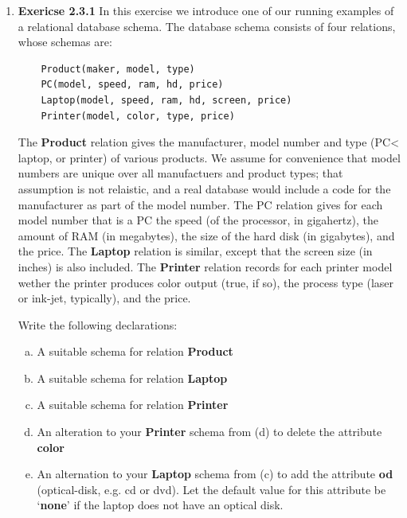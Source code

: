\documentclass[12pt]{article}
\begin{document}
\begin{enumerate}[1.]
    \item \textbf{Exericse 2.3.1} In this exercise we introduce one of our running
    examples of a relational database schema. The database schema consists of four relations,
    whose schemas are:

    \bigskip

    \begin{lstlisting}
    Product(maker, model, type)
    PC(model, speed, ram, hd, price)
    Laptop(model, speed, ram, hd, screen, price)
    Printer(model, color, type, price)
    \end{lstlisting}

    The \textbf{Product} relation gives the manufacturer, model number and type
    (PC< laptop, or printer) of various products. We assume for convenience that
    model numbers are unique over all manufactuers and product types; that assumption is
    not relaistic, and a real database would include a code for the manufacturer
    as part of the model number. The PC relation gives for each model number that
    is a PC the speed (of the processor, in gigahertz), the amount of RAM (in megabytes),
    the size of the hard disk (in gigabytes), and the price. The \textbf{Laptop}
    relation is similar, except that the screen size (in inches) is also included. The
    \textbf{Printer} relation records for each printer model wether the printer
    produces color output (true, if so), the process type (laser or ink-jet, typically),
    and the price.

    \bigskip

    Write the following declarations:

    \begin{enumerate}[a)]
        \item A suitable schema for relation \textbf{Product}
        \item A suitable schema for relation \textbf{Laptop}
        \item A suitable schema for relation \textbf{Printer}
        \item An alteration to your \textbf{Printer} schema from (d) to delete
        the attribute \textbf{color}
        \item An alternation to your \textbf{Laptop} schema from (c) to add the
        attribute \textbf{od} (optical-disk, e.g. cd or dvd). Let the default value
        for this attribute be `\textbf{none}' if the laptop does not have an optical
        disk.
    \end{enumerate}


\end{enumerate}
\end{document}
